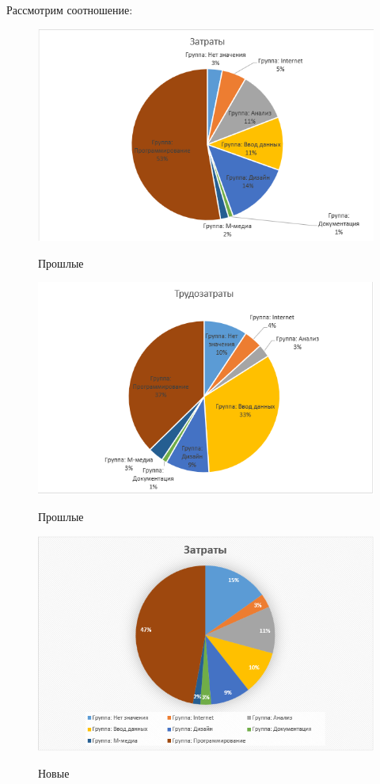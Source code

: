 Рассмотрим соотношение:

\begin{figure}[ht!]
	\includegraphics[width=0.75\linewidth]{assets/images/zatrat-2.png}
	\label{fig:r2}
	\caption{Прошлые}
\end{figure}
\FloatBarrier

\begin{figure}[ht!]
	\includegraphics[width=0.75\linewidth]{assets/images/tryd-2.png}
	\label{fig:r2}
	\caption{Прошлые}
\end{figure}
\FloatBarrier

\begin{figure}[ht!]
	\includegraphics[width=0.75\linewidth]{assets/images/zatrat-3.png}
	\label{fig:r2}
	\caption{Новые}
\end{figure}
\FloatBarrier

